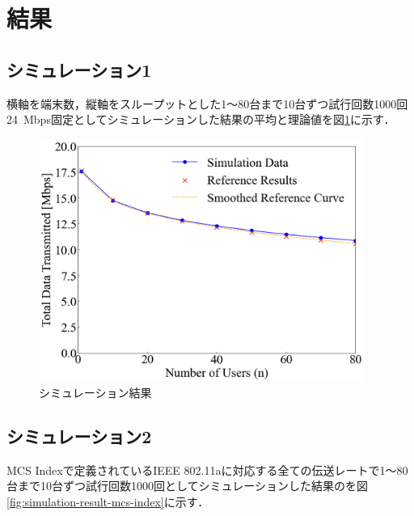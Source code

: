 \documentclass[a4paper,10pt]{ltjsarticle}
\begin{document}
\clearpage
\section{結果}

\subsection{シミュレーション1}
横軸を端末数，縦軸をスループットとした1～80台まで10台ずつ試行回数1000回24\, Mbps固定としてシミュレーションした結果の平均と理論値を図\ref{fig:simulation-result-a}に示す．





\begin{figure}[H]
  \centering
  \includegraphics[width=0.95\textwidth]{./assets/g3.png}
  \caption{シミュレーション結果}
  \label{fig:simulation-result-a}
\end{figure}


\subsection{シミュレーション2}

MCS Indexで定義されているIEEE 802.11aに対応する全ての伝送レートで1～80台まで10台ずつ試行回数1000回としてシミュレーションした結果のを図\ref{fig:simulation-result-mcs-index}に示す．
\end{document}
